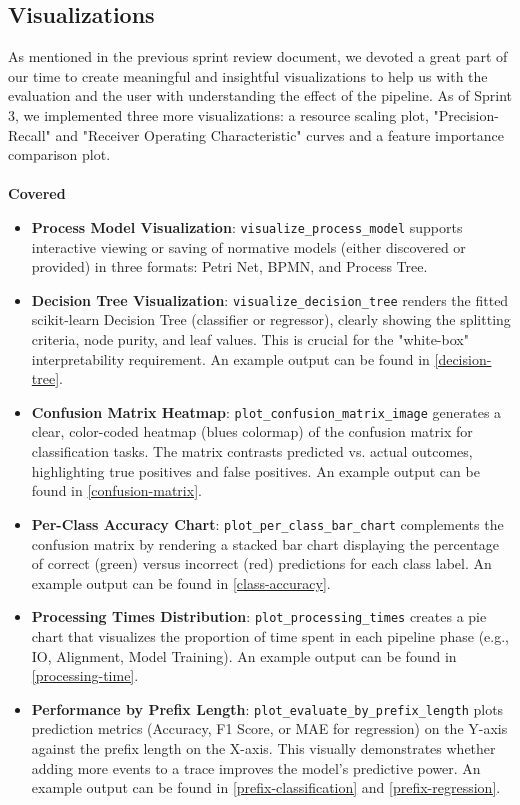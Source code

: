 \documentclass[12pt,a4paper]{article}
\begin{document}
\subsection{Visualizations}
As mentioned in the previous sprint review document, we devoted a great part of our time to create meaningful and insightful visualizations to help us with the evaluation and the user with understanding the effect of the pipeline. As of Sprint 3, we implemented three more visualizations: a resource scaling plot, "Precision-Recall" and "Receiver Operating Characteristic" curves and a feature importance comparison plot. \\\\
\textbf{Covered}\\
\begin{itemize}
    \item \textbf{Process Model Visualization}: \texttt{visualize\_process\_model} supports interactive viewing or saving of normative models (either discovered or provided) in three formats: Petri Net, BPMN, and Process Tree.
    \item \textbf{Decision Tree Visualization}: \texttt{visualize\_decision\_tree} renders the fitted scikit-learn Decision Tree (classifier or regressor), clearly showing the splitting criteria, node purity, and leaf values. This is crucial for the "white-box" interpretability requirement. An example output can be found in \ref{decision-tree}.
    \item \textbf{Confusion Matrix Heatmap}: \texttt{plot\_confusion\_matrix\_image} generates a clear, color-coded heatmap (blues colormap) of the confusion matrix for classification tasks. The matrix contrasts predicted vs. actual outcomes, highlighting true positives and false positives. An example output can be found in \ref{confusion-matrix}.
    \item \textbf{Per-Class Accuracy Chart}: \texttt{plot\_per\_class\_bar\_chart} complements the confusion matrix by rendering a stacked bar chart displaying the percentage of correct (green) versus incorrect (red) predictions for each class label. An example output can be found in \ref{class-accuracy}.
    \item \textbf{Processing Times Distribution}: \texttt{plot\_processing\_times} creates a pie chart that visualizes the proportion of time spent in each pipeline phase (e.g., IO, Alignment, Model Training). An example output can be found in \ref{processing-time}.
    \item \textbf{Performance by Prefix Length}: \texttt{plot\_evaluate\_by\_prefix\_length} plots prediction metrics (Accuracy, F1 Score, or MAE for regression) on the Y-axis against the prefix length on the X-axis. This visually demonstrates whether adding more events to a trace improves the model's predictive power. An example output can be found in \ref{prefix-classification} and \ref{prefix-regression}.
\end{itemize}
\end{document}
